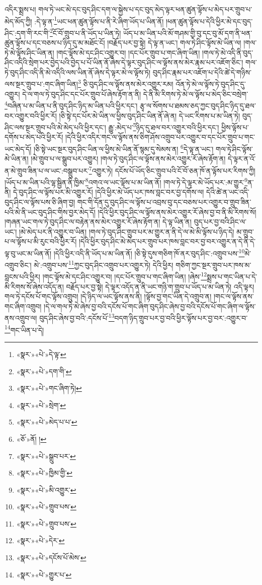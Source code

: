 འདིར་སྨྲས་པ། གལ་ཏེ་ཡང་མེ་དང་བུད་ཤིང་དག་ལ་སྐྱེས་པ་དང་བུད་མེད་ལྟར་ཕན་ཚུན་ལྟོས་པ་མེད་པར་གྲུབ་པ་མེད་མོད་ཀྱི། :དེ་ལྟ་ན་\footnote{«སྣར་»«པེ་»དེ་ལྟ་}ཡང་ཕན་ཚུན་ལྟོས་པ་ནི་རེ་ཞིག་ཡོད་པ་ཡིན་ནོ། །ཕན་ཚུན་ལྟོས་པ་དེའི་ཕྱིར་མེ་དང་བུད་ཤིང་:དག་གི་རང་གི་\footnote{«སྣར་»«པེ་»དག་གི་}ངོ་བོ་གྲུབ་པ་ནི་ཡོད་པ་ཡིན་ཏེ། ཡོད་པ་མ་ཡིན་པའི་མོ་གཤམ་གྱི་བུ་དང་བུ་མོ་དག་ནི་ཕན་ཚུན་ལྟོས་པ་དང་བཅས་པ་ཉིད་དུ་མ་མཐོང་ངོ། །བརྗོད་པར་བྱ་སྟེ། དེ་ལྟ་ན་ཡང་། གལ་ཏེ་ཤིང་ལྟོས་མེ་ཡིན་ལ། །གལ་ཏེ་མེ་ལྟོས་ཤིང་ཡིན་ན། །གང་ལྟོས་མེ་དང་ཤིང་འགྱུར་བ། །དང་པོར་གྲུབ་པ་གང་ཞིག་ཡིན། །གལ་ཏེ་མེ་འདི་ནི་བུད་ཤིང་འདིའི་སྲེག་པར་བྱེད་པའི་བྱེད་པ་པོ་ཡིན་ནོ་ཞེས་དེ་ལྟར་བུད་ཤིང་ལ་ལྟོས་ནས་མེར་རྣམ་པར་འཇོག་ཅིང་། གལ་ཏེ་བུད་ཤིང་འདི་ནི་མེ་འདིའི་ལས་ཡིན་ནོ་ཞེས་དེ་ལྟར་མེ་ལ་ལྟོས་ཏེ། བུད་ཤིང་རྣམ་པར་འཇོག་པ་དེའི་ཚེ་དེ་གཉིས་ལས་སྔར་གྲུབ་པ་:གང་ཞིག་ཡིན།\footnote{«སྣར་»«པེ་»གང་ཞིག་ཏེ།} ཅི་བུད་ཤིང་ལ་ལྟོས་ནས་མེར་འགྱུར་རམ། འོན་ཏེ་མེ་ལ་ལྟོས་ཏེ་བུད་ཤིང་དུ་འགྱུར། དེ་ལ་གལ་ཏེ་བུད་ཤིང་དང་པོར་གྲུབ་པོ་ཞེས་རྟོག་ན་ནི། དེ་ནི་མི་རིགས་ཏེ་མེ་ལ་ལྟོས་པ་མེད་ཅིང་བསྲེག་\footnote{«སྣར་»«པེ་»སྲེག་}བཞིན་པ་མ་ཡིན་པ་ནི་བུད་ཤིང་ཉིད་མ་ཡིན་པའི་ཕྱིར་དང་། རྩྭ་ལ་སོགས་པ་ཐམས་ཅད་ཀྱང་བུད་ཤིང་ཉིད་དུ་ཐལ་བར་འགྱུར་བའི་ཕྱིར་རོ། །ཅི་སྟེ་དང་པོར་མེ་ཡིན་ལ་ཕྱིས་བུད་ཤིང་ཡིན་ནོ་ཞེ་ན། དེ་ཡང་རིགས་པ་མ་ཡིན་ཏེ། བུད་ཤིང་ལས་སྔར་གྲུབ་པའི་མེ་མེད་པའི་ཕྱིར་དང་། རྒྱུ་:མེད་པ་\footnote{«སྣར་»«པེ་»མེད་པ་པ་}ཉིད་དུ་ཐལ་བར་འགྱུར་བའི་ཕྱིར་དང་། ཕྱིས་ལྟོས་པ་དགོས་པ་མེད་པའི་ཕྱིར་རོ། །དེའི་ཕྱིར་འདིར་གང་ལ་ལྟོས་ནས་ཅིག་ཤོས་འགྲུབ་པར་འགྱུར་བ་དང་པོར་གྲུབ་པ་གང་ཡང་མེད་དོ། །ཅི་སྟེ་ཡང་སྔར་བུད་ཤིང་ཡིན་ལ་ཕྱིས་མེ་ཡིན་ནོ་སྙམ་དུ་སེམས་ན། \footnote{«ཅོ་»ནོ། ། }དེ་ལྟ་ན་ཡང་། གལ་ཏེ་ཤིང་ལྟོས་མེ་ཡིན་ན། །མེ་གྲུབ་པ་ལ་སྒྲུབ་པར་འགྱུར། །གལ་ཏེ་བུད་ཤིང་ལ་ལྟོས་ནས་མེར་འགྱུར་རོ་ཞེས་རྟོག་ན། དེ་ལྟར་ན་འོ་ན་མེ་གྲུབ་ཟིན་པ་ལ་ཡང་:བསྒྲུབ་པར་\footnote{«སྣར་»«པེ་»སྒྲུབ་པར་}འགྱུར་ཏེ། དངོས་པོ་ཡོད་ཅིང་གྲུབ་པའི་ངོ་བོ་ཅན་ཁོ་ན་ལྟོས་པར་རིགས་ཀྱི། །ཡོད་པ་མ་ཡིན་པའི་ལྷ་སྦྱིན་ནི་ཁྱིམ་\footnote{«སྣར་»«པེ་»ཁྱིམ་གྱི་}འགའ་ལ་ཡང་ལྟོས་པ་མ་ཡིན་ནོ། །གལ་ཏེ་དེ་ལྟར་མེ་ཡོད་པར་:མ་གྱུར་\footnote{«སྣར་»«པེ་»མི་འགྱུར་}ན་ནི། དེ་བུད་ཤིང་ལ་ལྟོས་པར་མི་འགྱུར་རོ། །དེའི་ཕྱིར་མེ་ཡོད་པར་ཁས་བླང་བར་བྱ་དགོས་ལ། དེའི་ཚེ་ན་ཡང་འདི་བུད་ཤིང་ལ་ལྟོས་པས་ཅི་ཞིག་བྱ། གང་གི་དོན་དུ་བུད་ཤིང་ལ་ལྟོས་པ་འབྲས་བུ་དང་བཅས་པར་འགྱུར་བ་གྲུབ་ཟིན་པའི་མེ་ནི་ཡང་བུད་ཤིང་གིས་བྱར་མེད་དོ། །དེའི་ཕྱིར་བུད་ཤིང་ལ་ལྟོས་ནས་མེར་འགྱུར་རོ་ཞེས་བྱ་བ་ནི་མི་རིགས་སོ། །གཞན་ཡང་གལ་ཏེ་བུད་ཤིང་ལ་བརྟེན་ནས་མེར་འགྱུར་རོ་ཞེས་རྟོག་ན། དེ་ལྟ་ཡིན་ན། བུད་པར་བྱ་བའི་ཤིང་ལ་ཡང་། །མེ་མེད་པར་ནི་འགྱུར་བ་ཡིན། །གལ་ཏེ་བུད་ཤིང་གྲུབ་པར་མ་གྱུར་ན་ནི་དེ་ལ་མེ་མི་ལྟོས་པ་ཉིད་དེ། མ་གྲུབ་པ་ལ་ལྟོས་པ་མི་རུང་བའི་ཕྱིར་རོ། །དེའི་ཕྱིར་བུད་ཤིང་མེ་མེད་པར་གྲུབ་པར་ཁས་བླང་བར་བྱ་བར་འགྱུར་ན་དེ་ནི་དེ་ལྟ་བུ་ཡང་མ་ཡིན་ནོ། །དེའི་ཕྱིར་འདི་ནི་ཡོད་པ་མ་ཡིན་ནོ། །ཅི་སྟེ་དུས་གཅིག་ཁོ་ནར་བུད་ཤིང་:འགྲུབ་པས་\footnote{«སྣར་»«པེ་»གྲུབ་པས་}མེ་འགྲུབ་ཅིང་། མེ་:འགྲུབ་པས་\footnote{«སྣར་»«པེ་»གྲུབ་པས་}ཀྱང་བུད་ཤིང་འགྲུབ་པར་འགྱུར་ཏེ། དེའི་ཕྱིར། གཅིག་ཀྱང་སྔར་གྲུབ་པར་ཁས་མ་བླངས་པའི་ཕྱིར། །གང་ལྟོས་མེ་དང་ཤིང་འགྱུར་བ། །དང་པོར་གྲུབ་པ་གང་ཞིག་ཡིན། །ཞེས་\footnote{«སྣར་»«པེ་»དེར་}སྨྲས་པ་གང་ཡིན་པ་དེ་མི་རིགས་སོ་ཞེས་འདོད་ན། བརྗོད་པར་བྱ་སྟེ། དེ་ལྟར་འདོད་ན་ནི་ཡང་གཉི་ག་གྲུབ་པ་ཡོད་པ་མ་ཡིན་ཏེ། འདི་ལྟར། གལ་ཏེ་དངོས་པོ་གང་ལྟོས་འགྲུབ། །དེ་ཉིད་ལ་ཡང་ལྟོས་ནས་ནི། །ལྟོས་བྱ་གང་ཡིན་དེ་འགྲུབ་ན། །གང་ལ་ལྟོས་ནས་གང་ཞིག་འགྲུབ། །དེ་ལ་གལ་ཏེ་མེ་ཞེས་བྱ་བའི་དངོས་པོ་གང་ཞིག་བུད་ཤིང་ཞེས་བྱ་བའི་དངོས་པོ་གང་ཞིག་ལ་ལྟོས་ནས་འགྲུབ་ལ། བུད་ཤིང་ཞེས་བྱ་བའི་:དངོས་པོ་\footnote{«སྣར་»«པེ་»དངོས་པོ་མེས་}བདག་ཉིད་གྲུབ་པར་བྱ་བའི་ཕྱིར་ལྟོས་པར་བྱ་བར་:འགྱུར་བ་\footnote{«སྣར་»«པེ་»གྱུར་པ་}གང་ཡིན་པ་དེ། 